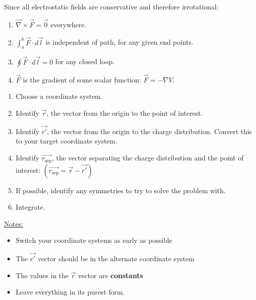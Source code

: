 \documentclass{article}
\newcommand{\sepvec}{\vec{r_\textrm{sep}}}
\newcommand{\formbox}[2]{\begin{center} \begin{tcolorbox}[title = #1, boxrule=2pt,arc=3.4pt,boxsep=0mm] #2\end{tcolorbox}\end{center}}
\begin{document}
\begin{multicols*}{3}
    \formbox{Rules for Irrotational Fields}{
        Since all electrostatic fields are conservative and therefore irrotational:
        \begin{enumerate}
            \item $\vec{\nabla} \times \vec{F} = \vec{0}$ everywhere.
            \item $\int_a^b\vec{F}\cdot d\vec{l}$ is independent of path, for any given end points.
            \item $\oint \vec{F}\cdot d\vec{l} = 0$ for any closed loop.
            \item $\vec{F}$ is the gradient of some scalar function: $\vec{F} = -\nabla V$.
        \end{enumerate}
    }
    
    \formbox{Problem Solving Stragegy -- Coulomb Integrals}{
        \begin{enumerate}
            \item Choose a coordinate system.
            \item Identify $\vec{r}$, the vector from the origin to the point of interest.
            \item Identify $\vec{r'}$, the vector from the origin to the charge distribution. Convert this to your target coordinate system.
            \item Identify $\sepvec$, the vector separating the charge distribution and the point of interest:
            $(\sepvec = \vec{r} - \vec{r'})$
            \item If possible, identify any symmetries to try to solve the problem with.
            \item Integrate.
        \end{enumerate}
        \underline{Notes:}
        \begin{itemize}
            \item Switch your coordinate systems as early as possible
            \item The $\vec{r'}$ vector should be in the alternate coordinate system
            \item The values in the $\vec{r}$ vector are \textbf{constants}
            \item Leave everything in its purest form.
        \end{itemize}
    }
    

\end{multicols*}
\end{document}
